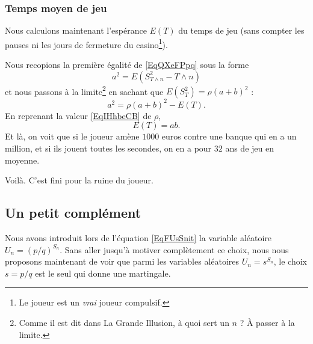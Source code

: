 \subsubsection{Temps moyen de jeu}

Nous calculons maintenant l'espérance \( E(T)\) du temps de jeu (sans compter les pauses ni les jours de fermeture du casino\footnote{Le joueur est un \emph{vrai} joueur compulsif.}).

Nous recopions la première égalité de \eqref{EqQXeFPpq} sous la forme
\begin{equation}
	a^2=E(S^2_{T\wedge n}-T\wedge n)
\end{equation}
et nous passons à la limite\footnote{Comme il est dit dans La Grande Illusion, à quoi sert un \( n\) ? À passer à la limite.} en sachant que \( E(S^2_T)=\rho(a+b)^2\) :
\begin{equation}
	a^2=\rho(a+b)^2-E(T).
\end{equation}
En reprenant la valeur \eqref{EqIHhbeCB} de \( \rho\),
\begin{equation}
	E(T)=ab.
\end{equation}
Et là, on voit que si le joueur amène \( 1000\) euros contre une banque qui en a un million, et si ils jouent toutes les secondes, on en a pour \( 32\) ans de jeu en moyenne.

Voilà. C'est fini pour la ruine du joueur.

\subsection{Un petit complément}
\label{SUBSECooACWWooBuSxGv}

Nous avons introduit lors de l'équation \eqref{EqFUsSnit} la variable aléatoire \( U_n=(p/q)^{S_n}\). Sans aller jusqu'à motiver complètement ce choix, nous nous proposons maintenant de voir que parmi les variables aléatoires \( U_n=s^{S_n}\), le choix \( s=p/q\) est le seul qui donne une martingale.

